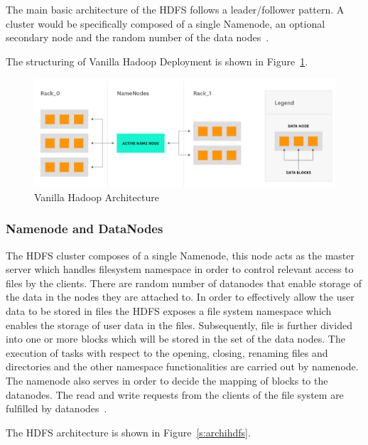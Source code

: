 The main basic architecture of the HDFS follows a 
leader/follower pattern. A cluster would be 
specifically composed of a single Namenode, 
an optional secondary node and the 
random number of the data nodes~\cite{hid-sp18-412-HDFS-Architecture}.

The structuring of Vanilla Hadoop Deployment is 
shown in Figure~\ref{s:vaniarchi}.

\begin{figure}[!ht]
\centering\includegraphics[width=\textwidth]{images/vanilla.png}
\caption{Vanilla 
Hadoop 
Architecture
~\cite{hid-sp18-412-hadoop-architecture-overview}}\label{s:vaniarchi}
\end{figure}

\subsubsection{Namenode and DataNodes}
The HDFS cluster composes of a single Namenode, this node acts as 
the master server which
 handles filesystem namespace in order to control 
relevant access to files by the clients.
There are random number of datanodes that enable 
storage of the data in the nodes
 they are attached to. In order to effectively allow the 
user data to be stored in
 files the HDFS exposes a file system namespace which 
enables the storage of user 
 data in the files. Subsequently, file is further 
divided into one or more blocks 
 which will be stored in the set of the data nodes. 
The execution of tasks with 
 respect to the opening, closing, renaming files and directories and the other 
 namespace functionalities are carried out by namenode. The namenode also 
 serves in order to decide the mapping of blocks to the datanodes. 
 The read and write requests from the clients of the file system
  are fulfilled by datanodes~\cite{hid-sp18-412-HDFS-Architecture}.

The HDFS architecture is shown in Figure~\ref{s:archihdfs}.

